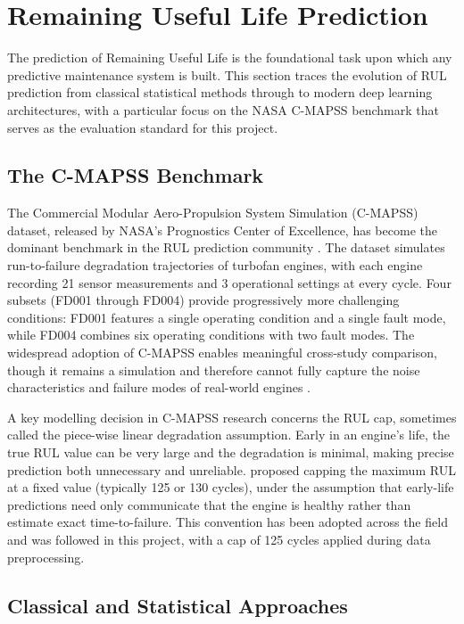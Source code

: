 \documentclass[12pt,a4paper]{report}
\begin{document}
\section{Remaining Useful Life Prediction}

The prediction of Remaining Useful Life is the foundational task upon which any predictive maintenance system is built. This section traces the evolution of RUL prediction from classical statistical methods through to modern deep learning architectures, with a particular focus on the NASA C-MAPSS benchmark that serves as the evaluation standard for this project.

\subsection{The C-MAPSS Benchmark}

The Commercial Modular Aero-Propulsion System Simulation (C-MAPSS) dataset, released by NASA's Prognostics Center of Excellence, has become the dominant benchmark in the RUL prediction community \citep{saxena2008damage}. The dataset simulates run-to-failure degradation trajectories of turbofan engines, with each engine recording 21 sensor measurements and 3 operational settings at every cycle. Four subsets (FD001 through FD004) provide progressively more challenging conditions: FD001 features a single operating condition and a single fault mode, while FD004 combines six operating conditions with two fault modes. The widespread adoption of C-MAPSS enables meaningful cross-study comparison, though it remains a simulation and therefore cannot fully capture the noise characteristics and failure modes of real-world engines \citep{ramasso2014review}.


A key modelling decision in C-MAPSS research concerns the RUL cap, sometimes called the piece-wise linear degradation assumption. Early in an engine's life, the true RUL value can be very large and the degradation is minimal, making precise prediction both unnecessary and unreliable. \citet{heimes2008recurrent} proposed capping the maximum RUL at a fixed value (typically 125 or 130 cycles), under the assumption that early-life predictions need only communicate that the engine is healthy rather than estimate exact time-to-failure. This convention has been adopted across the field and was followed in this project, with a cap of 125 cycles applied during data preprocessing.

\subsection{Classical and Statistical Approaches}
\end{document}
